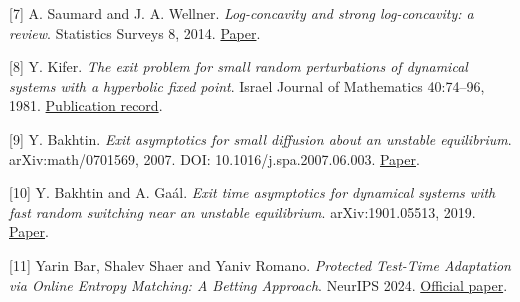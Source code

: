 {[}7{]} A. Saumard and J. A. Wellner. \emph{Log-concavity and strong
log-concavity: a review}. Statistics Surveys 8, 2014.
\href{https://arxiv.org/abs/1404.5886}{Paper}.

{[}8{]} Y. Kifer. \emph{The exit problem for small random perturbations
of dynamical systems with a hyperbolic fixed point}. Israel Journal of
Mathematics 40:74--96, 1981.
\href{https://cris.huji.ac.il/en/publications/the-exit-problem-for-small-random-perturbations-of-dynamical-syst/}{Publication
record}.

{[}9{]} Y. Bakhtin. \emph{Exit asymptotics for small diffusion about an
unstable equilibrium}. arXiv:math/0701569, 2007. DOI:
10.1016/j.spa.2007.06.003.
\href{https://arxiv.org/abs/math/0701569}{Paper}.

{[}10{]} Y. Bakhtin and A. Gaál. \emph{Exit time asymptotics for
dynamical systems with fast random switching near an unstable
equilibrium}. arXiv:1901.05513, 2019.
\href{https://arxiv.org/abs/1901.05513}{Paper}.

{[}11{]} Yarin Bar, Shalev Shaer and Yaniv Romano. \emph{Protected
Test-Time Adaptation via Online Entropy Matching: A Betting Approach}.
NeurIPS 2024.
\href{https://proceedings.neurips.cc/paper_files/paper/2024/file/9b35a0a20d617dc68ae98a7a57df2f51-Paper-Conference.pdf}{Official
paper}.
